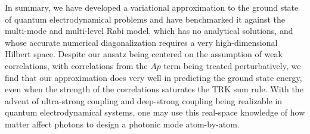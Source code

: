 \documentclass[aps,prl,twocolumn,
	groupedaddress,superscriptaddress,
	amsfonts,amssymb,amsmath,floatfix,
	citeautoscript]{revtex4-1}
\begin{document}
In summary, we have developed a variational approximation to the ground state of quantum electrodynamical problems and have benchmarked it against the multi-mode and multi-level Rabi model, which has no analytical solutions, and whose accurate numerical diagonalization requires a very high-dimensional Hilbert space. Despite our ansatz being centered on the assumption of weak correlations, with correlations from the $Ap$ term being treated perturbatively, we find that our approximation does very well in predicting the ground state energy, even when the strength of the correlations saturates the TRK sum rule.  With the advent of ultra-strong coupling and deep-strong coupling being realizable in quantum electrodynamical systems, one may use this real-space knowledge of how matter affect photons to design a photonic mode atom-by-atom.

%
\end{document}
